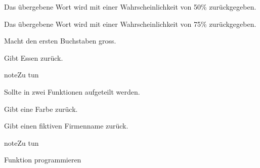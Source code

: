 \documentclass[a4paper,12pt,oneside]{sphinxmanual}
\begin{document}

\begin{fulllineitems}
\label{funktionen:pyzufall.e50}
Das übergebene Wort wird mit einer Wahrscheinlichkeit von 50\% zurückgegeben.

\end{fulllineitems}


\begin{fulllineitems}
\label{funktionen:pyzufall.e75}
Das übergebene Wort wird mit einer Wahrscheinlichkeit von 75\% zurückgegeben.

\end{fulllineitems}


\begin{fulllineitems}
\label{funktionen:pyzufall.ersten_buchstaben_gross}
Macht den ersten Buchstaben gross.

\end{fulllineitems}


\begin{fulllineitems}
\label{funktionen:pyzufall.essen}
Gibt Essen zurück.

\begin{notice}{note}{Zu tun}

Sollte in zwei Funktionen aufgeteilt werden.
\end{notice}

\end{fulllineitems}


\begin{fulllineitems}
\label{funktionen:pyzufall.farbe}
Gibt eine Farbe zurück.

\end{fulllineitems}


\begin{fulllineitems}
\label{funktionen:pyzufall.firma}
Gibt einen fiktiven Firmenname zurück.

\begin{notice}{note}{Zu tun}

Funktion programmieren
\end{notice}

\end{fulllineitems}
\end{document}
